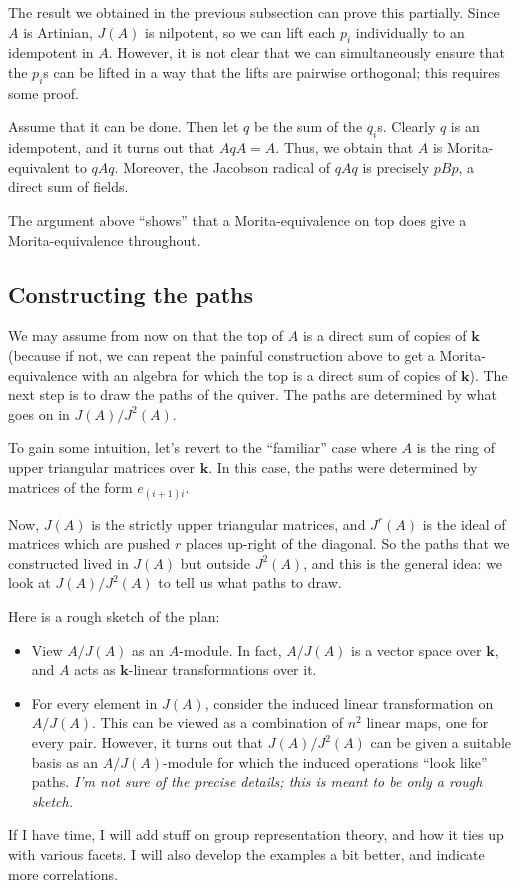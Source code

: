 \documentclass[a4paper]{amsart}
\newcommand{\field}{\mathbf{k}}
\begin{document}
The result we obtained in the previous subsection can prove this
partially. Since $A$ is Artinian, $J(A)$ is nilpotent, so we can lift
each $p_i$ individually to an idempotent in $A$. However, it is not
clear that we can simultaneously ensure that the $p_i$s can be lifted
in a way that the lifts are pairwise orthogonal; this requires some
proof.

Assume that it can be done. Then let $q$ be the sum of the
$q_i$s. Clearly $q$ is an idempotent, and it turns out that $AqA =
A$. Thus, we obtain that $A$ is Morita-equivalent to $qAq$. Moreover,
the Jacobson radical of $qAq$ is precisely $pBp$, a direct sum of
fields.

The argument above ``shows'' that a Morita-equivalence on top does
give a Morita-equivalence throughout. 

\subsection{Constructing the paths}

We may assume from now on that the top of $A$ is a direct sum of
copies of $\field$ (because if not, we can repeat the painful
construction above to get a Morita-equivalence with an algebra for
which the top is a direct sum of copies of $\field$). The next step
is to draw the paths of the quiver. The paths are determined by what
goes on in $J(A)/J^2(A)$.

To gain some intuition, let's revert to the ``familiar'' case where
$A$ is the ring of upper triangular matrices over $\field$. In this
case, the paths were determined by matrices of the form
$e_{(i+1)i}$. 

Now, $J(A)$ is the strictly upper triangular matrices, and $J^r(A)$ is
the ideal of matrices which are pushed $r$ places up-right of the
diagonal. So the paths that we constructed lived in $J(A)$ but outside
$J^2(A)$, and this is the general idea: we look at $J(A)/J^2(A)$ to
tell us what paths to draw.

Here is a rough sketch of the plan:

\begin{itemize}

\item View $A/J(A)$ as an $A$-module. In fact, $A/J(A)$ is a vector
  space over $\field$, and $A$ acts as $\field$-linear transformations
  over it.

\item For every element in $J(A)$, consider the induced linear
  transformation on $A/J(A)$. This can be viewed as a combination of
  $n^2$ linear maps, one for every pair. However, it turns out that
  $J(A)/J^2(A)$ can be given a suitable basis as an $A/J(A)$-module
  for which the induced operations ``look like'' paths. {\em I'm not
    sure of the precise details; this is meant to be only a rough
    sketch.}

\end{itemize}

If I have time, I will add stuff on group representation theory, and
how it ties up with various facets. I will also develop the examples a
bit better, and indicate more correlations.

\printindex
\end{document}
